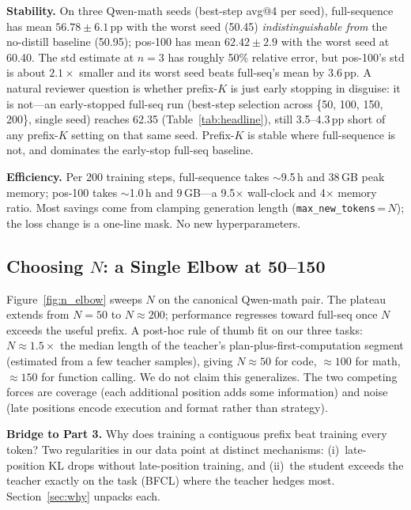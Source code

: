 \documentclass[10pt]{article}
\begin{document}
\textbf{Stability.} On three Qwen-math seeds (best-step avg@4 per seed), full-sequence has mean $56.78 \pm 6.1$\,pp with the worst seed (50.45) \emph{indistinguishable from} the no-distill baseline (50.95); pos-100 has mean $62.42 \pm 2.9$ with the worst seed at 60.40. The std estimate at $n{=}3$ has roughly 50\% relative error, but pos-100's std is about $2.1\times$ smaller and its worst seed beats full-seq's mean by 3.6\,pp. A natural reviewer question is whether prefix-$K$ is just early stopping in disguise: it is not---an early-stopped full-seq run (best-step selection across \{50, 100, 150, 200\}, single seed) reaches 62.35 (Table~\ref{tab:headline}), still 3.5--4.3\,pp short of any prefix-$K$ setting on that same seed. Prefix-$K$ is stable where full-sequence is not, and dominates the early-stop full-seq baseline.

\textbf{Efficiency.} Per 200 training steps, full-sequence takes $\sim$9.5\,h and 38\,GB peak memory; pos-100 takes $\sim$1.0\,h and 9\,GB---a 9.5$\times$ wall-clock and 4$\times$ memory ratio. Most savings come from clamping generation length (\texttt{max\_new\_tokens}\,=\,$N$); the loss change is a one-line mask. No new hyperparameters.

\subsection{Choosing $N$: a Single Elbow at 50--150}
\label{sec:n_elbow}

Figure~\ref{fig:n_elbow} sweeps $N$ on the canonical Qwen-math pair. The plateau extends from $N=50$ to $N\approx 200$; performance regresses toward full-seq once $N$ exceeds the useful prefix. A post-hoc rule of thumb fit on our three tasks: $N \approx 1.5\times$ the median length of the teacher's plan-plus-first-computation segment (estimated from a few teacher samples), giving $N\approx 50$ for code, $\approx 100$ for math, $\approx 150$ for function calling. We do not claim this generalizes. The two competing forces are coverage (each additional position adds some information) and noise (late positions encode execution and format rather than strategy).

\textbf{Bridge to Part 3.} Why does training a contiguous prefix beat training every token? Two regularities in our data point at distinct mechanisms: (i)~late-position KL drops without late-position training, and (ii)~the student exceeds the teacher exactly on the task (BFCL) where the teacher hedges most. Section~\ref{sec:why} unpacks each.
\end{document}

